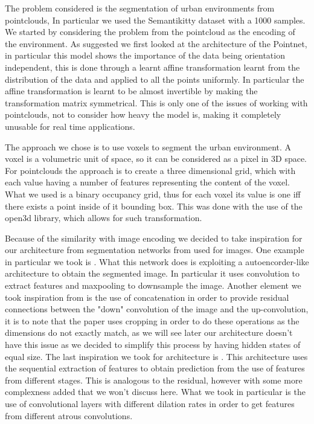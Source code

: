 The problem considered is the segmentation of urban environments from pointclouds,
In particular we used the Semantikitty dataset with a 1000 samples. 
We started by considering the problem from the pointcloud as the encoding of the 
environment. As suggested we first looked at the architecture of the Pointnet\cite{Pointnet},
in particular this model shows the importance of the data being orientation independent, this
is done through a learnt affine transformation learnt from the distribution of the data and 
applied to all the points uniformly. In particular the affine transformation is learnt to be
almost invertible by making the transformation matrix symmetrical. This is only one of the issues
of working with pointclouds, not to consider how heavy the model is, making it completely unusable for real time applications.\par
The approach we chose is to use voxels to segment the urban environment.
A voxel is a volumetric unit of space, so it can be considered as a pixel in 3D space. For pointclouds
the approach is to create a three dimensional grid, which with each value having a number of
features representing the content of the voxel. What we used is a binary occupancy grid, 
thus for each voxel its value is one iff there exists a point inside of it bounding box.
This was done with the use of the open3d library, which allows for such transformation.\par
Because of the similarity with image encoding we decided to take inspiration for our architecture
from segmentation networks from used for images. One example in particular we took is \cite{Unet}.
What this network does is exploiting a autoencorder-like architecture to obtain the segmented image.
In particular it uses convolution to extract features and maxpooling to downsample the image.
Another element we took inspiration from is the use of concatenation in order to provide
residual connections between the "down" convolution of the image and the up-convolution, it is
to note that the paper uses cropping in order to do these operations as the dimensions do not exactly match, as we will see later our architecture doesn't have this issue as we decided to simplify
this process by having hidden states of equal size.
The last inspiration we took for architecture is \cite{VoxSegNet}. This architecture uses the 
sequential extraction of features to obtain prediction from the use of features from different
stages. This is analogous to the residual, however with some more complexness added that we won't
discuss here. What we took in particular is the use of convolutional layers with different dilation rates in order to get features from different atrous convolutions.

